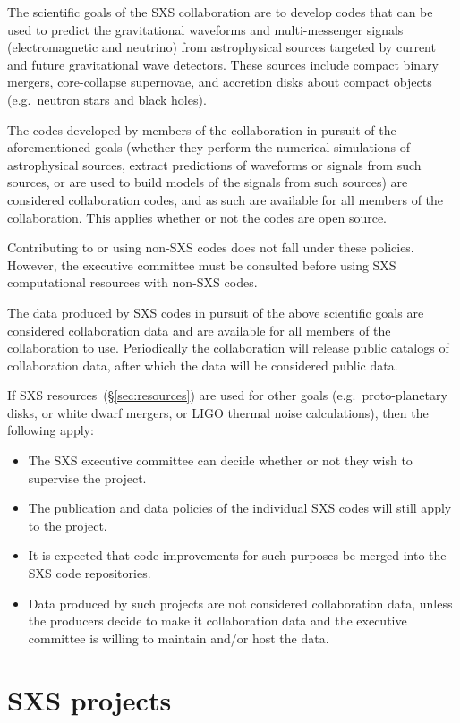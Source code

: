 \documentclass[12pt]{article}
\begin{document}
The scientific goals of the SXS collaboration are to develop codes
that can be used to predict the gravitational waveforms and
multi-messenger signals (electromagnetic and neutrino) from
astrophysical sources targeted by current and future gravitational
wave detectors.  These sources include compact binary mergers,
core-collapse supernovae, and accretion disks about compact objects
(e.g.~neutron stars and black holes).

The codes developed by members of the collaboration in pursuit of the
aforementioned goals (whether they perform the numerical simulations
of astrophysical sources, extract predictions of waveforms or signals
from such sources, or are used to build models of the signals from
such sources) are considered collaboration codes, and as such are
available for all members of the collaboration.  This applies whether
or not the codes are open source.

Contributing to or using non-SXS codes does not fall under these
policies.  However, the executive committee must be consulted before
using SXS computational resources with non-SXS codes.

The data produced by SXS codes in pursuit of the above scientific
goals are considered collaboration data and are available for all
members of the collaboration to use.  Periodically the collaboration
will release public catalogs of collaboration data, after which the
data will be considered public data.

If SXS resources~(\S\ref{sec:resources}) are used for other goals
(e.g.~proto-planetary disks, or white dwarf mergers, or LIGO thermal
noise calculations), then the following apply:
\begin{itemize}
\setlength\itemsep{-0.25em}
\item The SXS executive committee can decide whether or not they
  wish to supervise the project.
\item The publication and data policies of the individual SXS codes
  will still apply to the project.
\item It is expected that code improvements for such purposes be
  merged into the SXS code repositories.
\item Data produced by such projects are not considered collaboration
  data, unless the producers decide to make it collaboration data and
  the executive committee is willing to maintain and/or host the data.
\end{itemize}

\section{SXS projects}\label{sec:projects}
\end{document}
